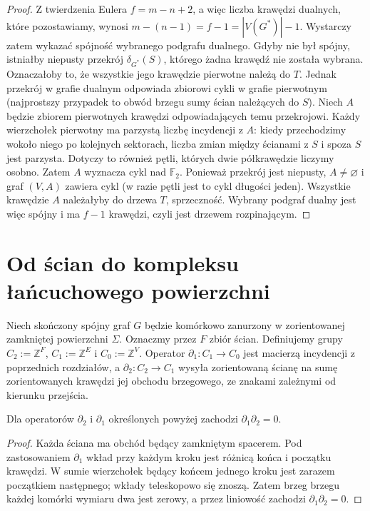 \begin{proof}
Z twierdzenia Eulera $f=m-n+2$, a więc liczba krawędzi
dualnych, które pozostawiamy, wynosi
$m-(n-1)=f-1=|V(G^*)|-1$.
Wystarczy zatem wykazać spójność wybranego podgrafu dualnego.
Gdyby nie był spójny, istniałby niepusty przekrój
$\delta_{G^*}(S)$, którego żadna krawędź nie została
wybrana. Oznaczałoby to, że wszystkie jego krawędzie
pierwotne należą do $T$. Jednak przekrój w grafie
dualnym odpowiada zbiorowi cykli w grafie pierwotnym
(najprostszy przypadek to obwód brzegu sumy ścian
należących do $S$). Niech $A$ będzie zbiorem pierwotnych krawędzi odpowiadających
temu przekrojowi. Każdy wierzchołek pierwotny ma parzystą
liczbę incydencji z $A$: kiedy przechodzimy wokoło niego
po kolejnych sektorach, liczba zmian między ścianami z $S$
i spoza $S$ jest parzysta. Dotyczy to również pętli,
których dwie półkrawędzie liczymy osobno. Zatem $A$
wyznacza cykl nad $\mathbb F_2$. Ponieważ przekrój jest
niepusty, $A\ne\varnothing$ i graf $(V,A)$ zawiera cykl
(w razie pętli jest to cykl długości jeden). Wszystkie
krawędzie $A$ należałyby do drzewa $T$, sprzeczność.
Wybrany podgraf dualny jest więc spójny i ma $f-1$
krawędzi, czyli jest drzewem rozpinającym.
\end{proof}

\section{Od ścian do kompleksu łańcuchowego powierzchni}
\label{sec:tg-surface-chains}

\begin{definicja}
Niech skończony spójny graf $G$ będzie komórkowo zanurzony
w zorientowanej zamkniętej powierzchni $\Sigma$.
Oznaczmy przez $F$ zbiór ścian. Definiujemy grupy
$C_2:=\mathbb Z^F$, $C_1:=\mathbb Z^E$ i
$C_0:=\mathbb Z^V$. Operator $\partial_1:C_1\to C_0$
jest macierzą incydencji z poprzednich rozdziałów,
a $\partial_2:C_2\to C_1$ wysyła zorientowaną ścianę
na sumę zorientowanych krawędzi jej obchodu brzegowego,
ze znakami zależnymi od kierunku przejścia.
\end{definicja}

\begin{stwierdzenie}
Dla operatorów $\partial_2$ i $\partial_1$ określonych
powyżej zachodzi $\partial_1\partial_2=0$.
\end{stwierdzenie}

\begin{proof}
Każda ściana ma obchód będący zamkniętym spacerem.
Pod zastosowaniem $\partial_1$ wkład przy każdym kroku
jest różnicą końca i początku krawędzi. W sumie
wierzchołek będący końcem jednego kroku jest zarazem
początkiem następnego; wkłady teleskopowo się znoszą.
Zatem brzeg brzegu każdej komórki wymiaru dwa jest zerowy,
a przez liniowość zachodzi $\partial_1\partial_2=0$.
\end{proof}

